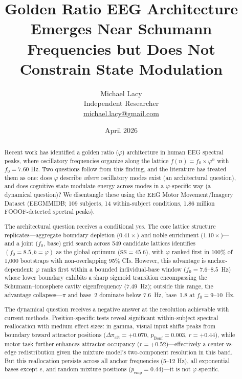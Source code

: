 \documentclass[11pt,a4paper]{article}
\title{Golden Ratio EEG Architecture Emerges Near Schumann Frequencies but Does Not Constrain State Modulation}
\author{Michael Lacy\\
\small Independent Researcher\\
\small \href{mailto:michael.lacy@gmail.com}{michael.lacy@gmail.com}}
\date{April 2026}
\newcommand{\phisym}{\varphi}
\newcommand{\fzero}{f_0}
\begin{document}
\maketitle

\begin{abstract}
Recent work has identified a golden ratio ($\phisym$) architecture in human EEG spectral peaks, where oscillatory frequencies organize along the lattice $f(n) = \fzero \times \phisym^n$ with $\fzero = 7.60$ Hz. Two questions follow from this finding, and the literature has treated them as one: does $\phisym$ describe \emph{where} oscillatory modes exist (an architectural question), and does cognitive state modulate energy across modes in a $\phisym$-specific way (a dynamical question)? We disentangle these using the EEG Motor Movement/Imagery Dataset (EEGMMIDB; 109 subjects, 14 within-subject conditions, 1.86 million FOOOF-detected spectral peaks).

The architectural question receives a conditional yes. The core lattice structure replicates---aggregate boundary depletion ($0.41\times$) and noble enrichment ($1.10\times$)---and a joint ($\fzero$, base) grid search across 549 candidate lattices identifies $(\fzero = 8.5, b = \phisym)$ as the global optimum ($\text{SS} = 45.6$), with $\phisym$ ranked first in 100\% of 1,000 bootstraps with non-overlapping 95\% CIs. However, this advantage is anchor-dependent: $\phisym$ ranks first within a bounded individual-base window ($\fzero = 7.6$--$8.5$~Hz) whose lower boundary exhibits a sharp sigmoid transition encompassing the Schumann--ionosphere cavity eigenfrequency ($7.49$~Hz); outside this range, the advantage collapses---$\pi$ and base~2 dominate below $7.6$~Hz, base~1.8 at $\fzero = 9$--$10$~Hz.

The dynamical question receives a negative answer at the resolution achievable with current methods. Position-specific tests reveal significant within-subject spectral reallocation with medium effect sizes: in gamma, visual input shifts peaks from boundary toward attractor positions ($\Delta\pi_{\text{att}} = +0.070$, $p_{\text{Bonf}} = 0.003$, $r = +0.44$), while motor task further enhances attractor occupancy ($r = +0.52$)---effectively a center-vs-edge redistribution given the mixture model's two-component resolution in this band. But this reallocation persists across all anchor frequencies (5--12 Hz), all exponential bases except $e$, and random mixture positions ($p_{\text{emp}} = 0.44$)---it is not $\phisym$-specific.


\end{abstract}
\end{document}

